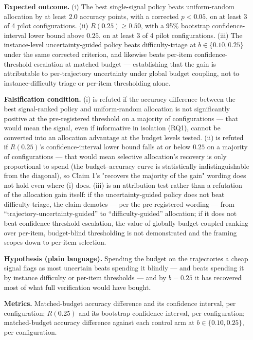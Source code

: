 \documentclass[11pt]{article}
\begin{document}
\textbf{Expected outcome.} (i) The best single-signal policy beats uniform-random allocation by at least 2.0 accuracy points, with a corrected $p < 0.05$, on at least 3 of 4 pilot configurations. (ii) $R(0.25) \geq 0.50$, with a 95\% bootstrap confidence-interval lower bound above $0.25$, on at least 3 of 4 pilot configurations. (iii) The instance-level uncertainty-guided policy beats difficulty-triage at $b \in \{0.10, 0.25\}$ under the same corrected criterion, and likewise beats per-item confidence-threshold escalation at matched budget --- establishing that the gain is attributable to per-trajectory uncertainty under global budget coupling, not to instance-difficulty triage or per-item thresholding alone.

\textbf{Falsification condition.} (i) is refuted if the accuracy difference between the best signal-ranked policy and uniform-random allocation is not significantly positive at the pre-registered threshold on a majority of configurations --- that would mean the signal, even if informative in isolation (RQ1), cannot be converted into an allocation advantage at the budget levels tested. (ii) is refuted if $R(0.25)$'s confidence-interval lower bound falls at or below $0.25$ on a majority of configurations --- that would mean selective allocation's recovery is only proportional to spend (the budget--accuracy curve is statistically indistinguishable from the diagonal), so Claim 1's "recovers the majority of the gain" wording does not hold even where (i) does. (iii) is an attribution test rather than a refutation of the allocation gain itself: if the uncertainty-guided policy does not beat difficulty-triage, the claim demotes --- per the pre-registered wording --- from ``trajectory-uncertainty-guided'' to ``difficulty-guided'' allocation; if it does not beat confidence-threshold escalation, the value of globally budget-coupled ranking over per-item, budget-blind thresholding is not demonstrated and the framing scopes down to per-item selection.

\textbf{Hypothesis (plain language).} Spending the budget on the trajectories a cheap signal flags as most uncertain beats spending it blindly --- and beats spending it by instance difficulty or per-item thresholds --- and by $b = 0.25$ it has recovered most of what full verification would have bought.

\textbf{Metrics.} Matched-budget accuracy difference and its confidence interval, per configuration; $R(0.25)$ and its bootstrap confidence interval, per configuration; matched-budget accuracy difference against each control arm at $b \in \{0.10, 0.25\}$, per configuration.
\end{document}
